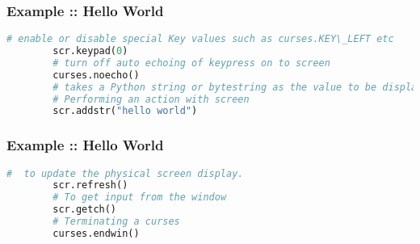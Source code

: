 \documentclass[14pt]{beamer}
\begin{document}
    \begin{frame}[containsverbatim]
        \frametitle{Example :: Hello World}
        \begin{lstlisting}[language=Python]
        # enable or disable special Key values such as curses.KEY\_LEFT etc
        scr.keypad(0)
        # turn off auto echoing of keypress on to screen
        curses.noecho() 
        # takes a Python string or bytestring as the value to be displayed.
        # Performing an action with screen
        scr.addstr("hello world") 
        \end{lstlisting}
    \end{frame}
    \begin{frame}[containsverbatim]
        \frametitle{Example :: Hello World}
        \begin{lstlisting}[language=Python]
        #  to update the physical screen display.
        scr.refresh() 
        # To get input from the window
        scr.getch()  
        # Terminating a curses
        curses.endwin()
        \end{lstlisting}
    \end{frame}
\end{document}
